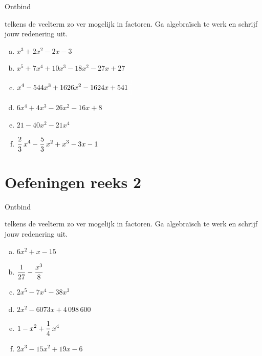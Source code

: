 \documentclass{ximera}
\begin{document}
\begin{exercise} 
\hypertarget{oef4.4}{Ontbind} telkens de veelterm zo ver mogelijk in factoren. Ga algebra\"isch te werk en schrijf jouw redenering uit.  
\begin{multicols}{2}
\begin{enumerate}[(a)]
\item
$x^3+2x^2-2x-3$
\item
$x^5+7x^4+10x^3-18x^2-27x+27$
\item 
$\D x^4-544x^3+1626x^2-1624x+541 \mph{\frac{2}{3}}$
\item
$6x^4 + 4x^3 - 26x^2 - 16x + 8$
\item
$21-40x^2-21x^4$
\item
$\displaystyle \frac{2}{3}\,x^4-\frac{5}{3}\,x^2 + x^3 - 3x-1$
\end{enumerate}
\end{multicols}
\end{exercise} 














\section*{Oefeningen reeks 2}

\begin{exercise} 
\hypertarget{oef4.5}{Ontbind} telkens de veelterm zo ver mogelijk in factoren. Ga algebra\"isch te werk en schrijf jouw redenering uit.  
\begin{multicols}{2}
\begin{enumerate}[(a)]
\item
$6x^2+x-15$
\item
$\displaystyle \frac{1}{27} - \frac{x^3}{8}$
\item
$2x^5-7x^4-38x^3$
\item
$2x^2 - 6073x + 4\,098\,600$
\item
$\displaystyle 1-x^2+\frac{1}{4}\,x^4$
\item
$2x^3 - 15x^2 + 19x - 6$
\end{enumerate}
\end{multicols}
\end{exercise} 
\end{document}
